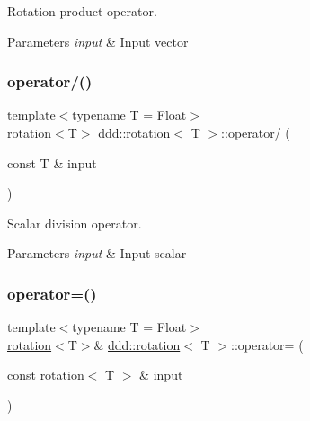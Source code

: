 Rotation product operator. 


\begin{DoxyParams}{Parameters}
{\em input} & Input vector \\
\hline
\end{DoxyParams}
\mbox{\label{classddd_1_1rotation_ac95799a9a25f9653d39ab3339b8085b7}} 
\subsubsection{\texorpdfstring{operator/()}{operator/()}}
{\footnotesize\ttfamily template$<$typename T  = Float$>$ \\
\hyperlink{classddd_1_1rotation}{rotation}$<$T$>$ \hyperlink{classddd_1_1rotation}{ddd\+::rotation}$<$ T $>$\+::operator/ (\begin{DoxyParamCaption}\item[{const T \&}]{input }\end{DoxyParamCaption})\hspace{0.3cm}{\ttfamily [inline]}}



Scalar division operator. 


\begin{DoxyParams}{Parameters}
{\em input} & Input scalar \\
\hline
\end{DoxyParams}
\mbox{\label{classddd_1_1rotation_a7ea14405fb6eba57a9cf3de1bc200fd0}} 
\subsubsection{\texorpdfstring{operator=()}{operator=()}}
{\footnotesize\ttfamily template$<$typename T  = Float$>$ \\
\hyperlink{classddd_1_1rotation}{rotation}$<$T$>$\& \hyperlink{classddd_1_1rotation}{ddd\+::rotation}$<$ T $>$\+::operator= (\begin{DoxyParamCaption}\item[{const \hyperlink{classddd_1_1rotation}{rotation}$<$ T $>$ \&}]{input }\end{DoxyParamCaption})\hspace{0.3cm}{\ttfamily [inline]}}



